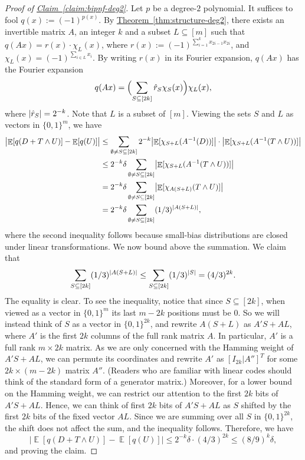\documentclass[11pt]{article}
\numberwithin{equation}{section}
\theoremstyle{definition}
\theoremstyle{plain}
\newcommand{\expref}[2]{\hyperref[#2]{#1~\ref{#2}}}
\newcommand{\zo}{\{0,1\}}
\def\hr{\hat r}
\DeclarePairedDelimiter{\abs}{\lvert}{\rvert}
\DeclareMathOperator*{\E}{\mathbb{E}}                 %
\begin{document}
\begin{proof}[Proof of {\expref{Claim}{claim:bipnf-deg2}}]
  Let $p$ be a degree-$2$ polynomial.
  It suffices to fool $q(x) := (-1)^{p(x)}$.
  By \expref{Theorem}{thm:structure-deg2}, there exists an invertible matrix $A$, an integer $k$ and a subset $L \subseteq [m]$ such that $q(Ax) = r(x) \cdot \chi_L(x)$,
  where $r(x) := (-1)^{\sum_{i=1}^k x_{2i-1} x_{2i}}$, and $\chi_L(x) = (-1)^{\sum_{i \in L} x_i}$.
  By writing $r(x)$ in its Fourier expansion, $q(Ax)$ has the Fourier expansion
  \[
    q(Ax) = \Bigl( \sum_{S \subseteq [2k]} \hr_S \chi_S(x) \Bigr) \chi_L(x), 
  \]
  where $\abs{\hr_S} = 2^{-k}$.
  Note that $L$ is a subset of $[m]$.
  Viewing the sets $S$ and $L$ as vectors in $\zo^m$, we have
  \begin{align*}
    \bigl| \E[q(D + T \wedge U)] - \E[q(U)] \bigr|
    &\le \sum_{\emptyset \neq S \subseteq [2k]} 2^{-k} \bigl| \E[\chi_{S + L}(A^{-1}(D))] \bigr| \cdot \bigl| \E[ \chi_{S + L}(A^{-1}(T \wedge U))] \bigr| \\
    &\le 2^{-k} \delta \sum_{\emptyset \neq S \subseteq [2k]} \bigl| \E[ \chi_{S + L}(A^{-1}(T \wedge U))] \bigr| \\
    &= 2^{-k} \delta \sum_{\emptyset \neq S \subseteq [2k]} \bigl| \E[ \chi_{A(S + L)}(T \wedge U)] \bigr| \\
    &= 2^{-k} \delta \sum_{\emptyset \neq S \subseteq [2k]} (1/3)^{\abs{A(S + L)}} ,
  \end{align*}
  where the second inequality follows because small-bias distributions are closed under linear transformations.
  We now bound above the summation.
  We claim that
  \[
    \sum_{S \subseteq [2k]} (1/3)^{\abs{A(S + L)}} \le \sum_{S \subseteq [2k]} (1/3)^{\abs{S}} = (4/3)^{2k} .
  \]
  The equality is clear.
  To see the inequality, notice that since $S \subseteq [2k]$, when viewed as a vector in $\zo^m$ its last $m-2k$ positions must be $0$.
  So we will instead think of $S$ as a vector in $\zo^{2k}$, and rewrite $A(S + L)$ as $A'S + AL$, where $A'$ is the first $2k$ columns of the full rank matrix $A$.
  In particular, $A'$ is a full rank $m \times 2k$ matrix.
  As we are only concerned with the Hamming weight of $A'S + AL$, we can permute its coordinates and rewrite $A'$ as $[I_{2k} | A'']^T$ for some $2k \times (m - 2k)$ matrix $A''$.
  (Readers who are familiar with linear codes should think of the standard form of a generator matrix.)
  Moreover, for a lower bound on the Hamming weight, we can restrict our attention to the first $2k$ bits of $A'S + AL$.
  Hence, we can think of first $2k$ bits of $A'S + AL$ as $S$ shifted by the first $2k$ bits of the fixed vector $AL$.
  Since we are summing over all $S$ in $\zo^{2k}$, the shift does not affect the sum, and the inequality follows.
  Therefore, we have
  \[
    \bigl| \E[q(D + T \wedge U)] - \E[q(U)] \bigr|
    \le 2^{-k} \delta \cdot (4/3)^{2k}
    \le (8/9)^k \delta,
  \]
  and proving the claim.
\end{proof}
\end{document}
